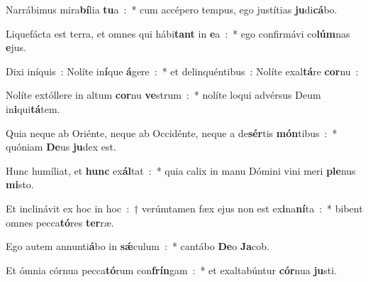﻿\item Narrábimus mira\textbf{bí}lia \textbf{tu}a~:~* cum accépero tempus, ego justítias \textbf{ju}di\textbf{cá}bo.
\item Liquefácta est terra, et omnes qui hábi\textbf{tant} in \textbf{e}a~:~* ego confirmávi co\textbf{lúm}nas \textbf{e}jus.
\item Dixi iníquis~: Nolíte in\textbf{í}que \textbf{á}gere~:~* et delinquéntibus~: Nolíte exal\textbf{tá}re \textbf{cor}nu~:
\item Nolíte extóllere in altum \textbf{cor}nu \textbf{ve}strum~:~* nolíte loqui advérsus Deum in\textbf{i}qui\textbf{tá}tem.
\item Quia neque ab Oriénte, neque ab Occidénte, neque a de\textbf{sér}tis \textbf{món}tibus~:~* quóniam \textbf{De}us \textbf{ju}dex est.
\item Hunc humíliat, et \textbf{hunc} ex\textbf{ál}tat~:~* quia calix in manu Dómini vini meri \textbf{ple}nus \textbf{mi}sto.
\item Et inclinávit ex hoc in hoc~:~† verúmtamen fæx ejus non est ex\textbf{i}na\textbf{ní}ta~:~* bibent omnes pecca\textbf{tó}res \textbf{ter}ræ.
\item Ego autem annunti\textbf{á}bo in \textbf{sǽ}culum~:~* cantábo \textbf{De}o \textbf{Ja}cob.
\item Et ómnia córnua pecca\textbf{tó}rum con\textbf{frín}gam~:~* et exaltabúntur \textbf{cór}nua \textbf{ju}sti.